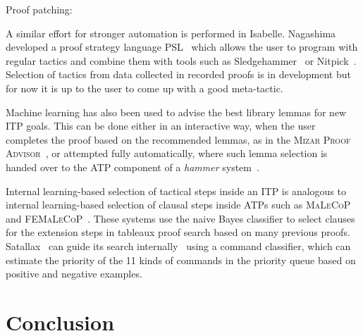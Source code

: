 \documentclass[runningheads,a4paper,draft]{svjour3}
\def\isabelle{\textsf{Isabelle}\xspace}
\def\hollight{\textsf{HOL Light}\xspace}
\def\sledgehammer{\textsf{Sledgehammer}\xspace}
\begin{document}
Proof patching: \cite{RingerYLG18}

A similar effort for stronger automation is performed in \isabelle. Nagashima 
developed a proof strategy language PSL~\cite{NagashimaK17psl} which allows the 
user to 
program with regular tactics and combine them with tools such as 
\sledgehammer~\cite{sledgehammer10} or Nitpick~\cite{Nitpick10}. 
Selection of tactics from data collected in recorded proofs is in development 
but for now it is up to the user to come up with a good meta-tactic.


Machine learning has also been used to advise the best library lemmas for new 
ITP goals.
This can be done either in an interactive way, when the user completes the 
proof based on the recommended lemmas, as in the \textsc{Mizar Proof 
Advisor}~\cite{Urb04-MPTP0}, or attempted fully automatically, where such lemma 
selection is handed over to the ATP component of a \emph{hammer} 
system~\cite{hammers4qed,tgck-cpp15,holyhammer,BlanchetteGKKU16,mizAR40}.

Internal learning-based selection of tactical steps inside an ITP is analogous 
to internal learning-based selection of clausal steps inside ATPs such as 
\textsc{MaLeCoP}~\cite{malecop} and \textsc{FEMaLeCoP}~\cite{femalecop}. These 
systems
use the naive Bayes classifier to  select clauses for the extension steps in
tableaux proof search based on many previous proofs. Satallax~\cite{Brown2012a} 
can guide its
search internally~\cite{mllax} using a command classifier, which can estimate 
the priority of the 11 kinds of
commands in the priority queue based on positive and negative examples.




\section{Conclusion}\label{sec:concl}

\end{document}
